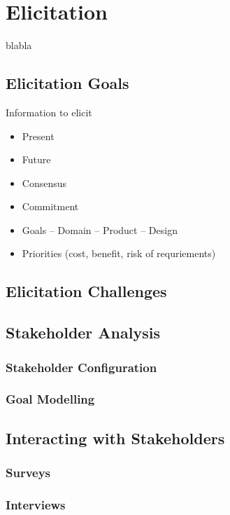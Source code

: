 
\chapter{Elicitation}%
blabla

\section{Elicitation Goals}

Information to elicit
\begin{itemize}
  \item Present
  \item Future 
  \item Consensus 
  \item Commitment 
  \item Goals -- Domain -- Product -- Design
  \item Priorities (cost, benefit, risk of requriements)
\end{itemize}


\section{Elicitation Challenges}%

\section{Stakeholder Analysis}

\subsection{Stakeholder Configuration}

\subsection{Goal Modelling}

\section{Interacting with Stakeholders}%

\subsection{Surveys}

\subsection{Interviews}

